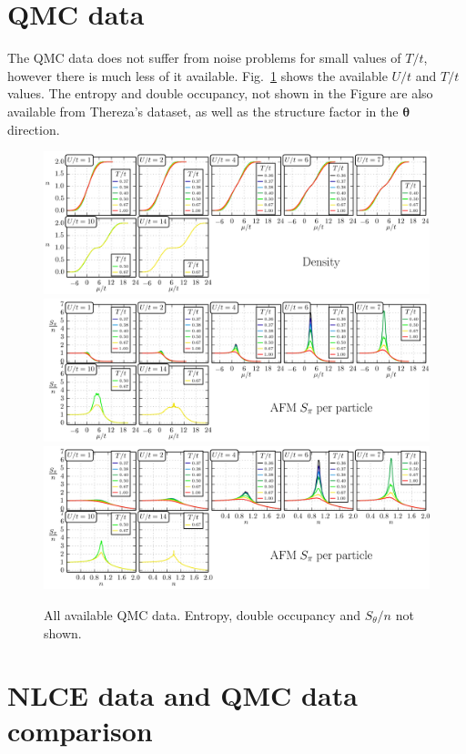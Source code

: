 \documentclass[11pt,letter]{article}
\newcommand{\bv}[1]{\ensuremath{\bm{#1}}}
\begin{document}
\section{ QMC data } 

The QMC data does not suffer from noise problems for small values of $T/t$,
however there is much less of it available.  Fig.~\ref{fig:QMCall} shows the
available $U/t$ and $T/t$ values.  The entropy and double occupancy, not shown
in the Figure are also available from Thereza's dataset,  as well as the
structure factor in the $\bv{\theta}$ direction. 
\begin{figure}
    \centering
\includegraphics[width=\textwidth]{../dataplots/QMC_Final/density_All.png}
\includegraphics[width=\textwidth]{../dataplots/QMC_Final/spi_n_All.png}
\includegraphics[width=\textwidth]{../dataplots/QMC_Final/spi_n_n_All.png}
\caption{All available QMC data.  Entropy, double occupancy and  $S_{\theta}/n$
not shown.  }
\label{fig:QMCall}
\end{figure}


\section{ NLCE data and QMC data comparison} 
\end{document}
